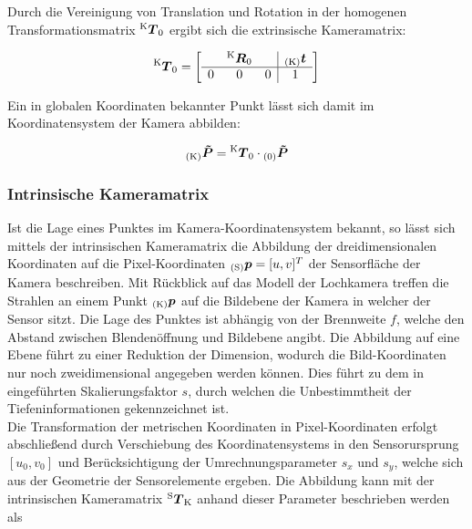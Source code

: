 Durch die Vereinigung von Translation und Rotation in der homogenen Transformationsmatrix $\tmat{K}{0}$ ergibt sich die extrinsische Kameramatrix:

\begin{equation}
\tmat{K}{0} = 
\mat{ccc|c}{
  & \rmat{K}{0} &   & \ve{K}{t} \\
\hline
0 &      0      & 0 & 1 \\
}
\end{equation}


Ein in globalen Koordinaten bekannter Punkt lässt sich damit im Koordinatensystem der Kamera abbilden:

\begin{equation}
\ve{K}{\tilde{P}} = \tmat{K}{0} \cdot \ve{0}{\tilde{P}}
\end{equation}


\subsubsection{Intrinsische Kameramatrix}
Ist die Lage eines Punktes im Kamera-Koordinatensystem bekannt, so lässt sich mittels der intrinsischen Kameramatrix die Abbildung der dreidimensionalen Koordinaten auf die Pixel-Koordinaten $\ve{S}{p} = [u,v]^T$ der Sensorfläche der Kamera beschreiben. Mit Rückblick auf das Modell der Lochkamera treffen die Strahlen an einem Punkt $\ve{K}{{p}}$ auf die Bildebene der Kamera in welcher der Sensor sitzt. Die Lage des Punktes ist abhängig von der Brennweite $f$, welche den Abstand zwischen Blendenöffnung und Bildebene angibt. Die Abbildung auf eine Ebene führt zu einer Reduktion der Dimension, wodurch die Bild-Koordinaten nur noch zweidimensional angegeben werden können. Dies führt zu dem in  eingeführten Skalierungsfaktor $s$, durch welchen die Unbestimmtheit der Tiefeninformationen gekennzeichnet ist.\\

Die Transformation der metrischen Koordinaten in Pixel-Koordinaten erfolgt abschließend durch Verschiebung des Koordinatensystems in den Sensorursprung $[u_0,v_0]$ und Berücksichtigung der Umrechnungsparameter $s_x$ und $s_y$, welche sich aus der Geometrie der Sensorelemente ergeben. Die Abbildung kann mit der intrinsischen Kameramatrix $\tmat{S}{K}$ anhand dieser Parameter beschrieben werden als

